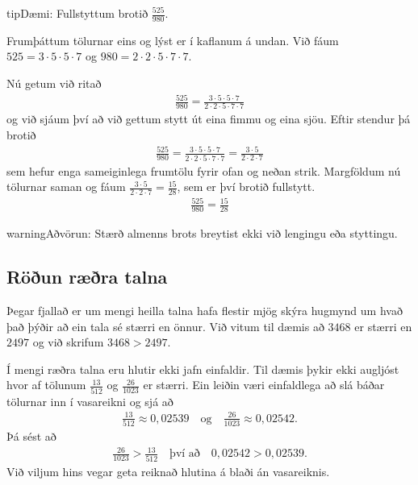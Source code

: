 \documentclass[a4paper,10pt,icelandic]{sphinxmanual}
\begin{document}
\begin{sphinxadmonition}{tip}{Dæmi:}
Fullstyttum brotið \(\frac{525}{980}\).

Frumþáttum tölurnar eins og lýst er í kaflanum á undan. Við fáum \(525=3 \cdot 5 \cdot 5 \cdot 7\) og \(980=2 \cdot 2 \cdot 5 \cdot 7 \cdot 7\).

Nú getum við ritað
\begin{equation*}
\begin{split}\frac{525}{980}=\frac{3 \cdot 5 \cdot 5 \cdot 7}{2 \cdot 2 \cdot 5 \cdot 7 \cdot 7}\end{split}
\end{equation*}
og við sjáum því að við gettum stytt út eina fimmu og eina sjöu. Eftir stendur þá brotið
\begin{equation*}
\begin{split}\frac{525}{980}=\frac{3 \cdot 5 \cdot 5 \cdot 7}{2 \cdot 2 \cdot 5 \cdot 7 \cdot 7} = \frac{3 \cdot 5}{2 \cdot 2 \cdot 7}\end{split}
\end{equation*}
sem hefur enga sameiginlega frumtölu fyrir ofan og neðan strik.
Margföldum nú tölurnar saman og fáum \(\frac{3 \cdot 5}{2 \cdot 2 \cdot 7}=\frac{15}{28}\), sem er því brotið fullstytt.
\begin{equation*}
\begin{split}\frac{525}{980}=\frac{15}{28}\end{split}
\end{equation*}\end{sphinxadmonition}

\begin{sphinxadmonition}{warning}{Aðvörun:}
Stærð almenns brots breytist ekki við lengingu eða styttingu.
\end{sphinxadmonition}


\subsection{Röðun ræðra talna}
\label{\detokenize{Kafli01:roun-raera-talna}}
Þegar fjallað er um mengi heilla talna hafa flestir mjög skýra hugmynd um hvað það þýðir að ein tala sé stærri en önnur. Við vitum til dæmis að \(3468\) er stærri en \(2497\) og við skrifum \(3468>2497\).

Í mengi ræðra talna eru hlutir ekki jafn einfaldir. Til dæmis þykir ekki augljóst hvor af tölunum
\(\frac{13}{512}\) og \(\frac{26}{1023}\) er stærri.
Ein leiðin væri einfaldlega að slá báðar tölurnar inn í vasareikni og sjá að
\begin{equation*}
\begin{split}\frac{13}{512}\approx 0,02539 \quad \text{og} \quad \frac{26}{1023}\approx 0,02542.\end{split}
\end{equation*}
Þá sést að
\begin{equation*}
\begin{split}\frac{26}{1023}>\frac{13}{512} \quad \text{því að} \quad 0,02542>0,02539.\end{split}
\end{equation*}
Við viljum hins vegar geta reiknað hlutina á blaði án vasareiknis.
\end{document}
